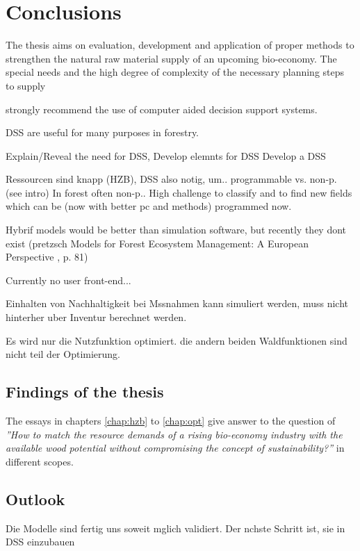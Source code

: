 \chapter{Conclusions}
\label{chap:discussion}
\newpage
\noindent
The thesis aims on evaluation, development and application of proper methods to strengthen the natural raw material supply of an upcoming bio-economy. The special needs and the high degree of complexity 
of the necessary planning steps to supply

strongly recommend the use of computer aided decision support systems.


DSS are useful for many purposes in forestry.

Explain/Reveal the need for DSS, 
Develop elemnts for DSS
Develop a DSS

Ressourcen sind knapp (HZB), DSS also notig, um..
programmable vs. non-p. (see intro) In forest often non-p.. High challenge to classify and to find new fields which can be (now with better pc and methods) programmed now.



Hybrif models would be better than simulation software, but recently they dont exist (pretzsch Models for Forest Ecosystem Management: A European Perspective
, p. 81)

Currently no user front-end...

Einhalten von Nachhaltigkeit bei Mssnahmen kann simuliert werden, muss nicht hinterher uber Inventur berechnet werden.

Es wird nur die Nutzfunktion optimiert. die andern beiden Waldfunktionen sind nicht teil der Optimierung.
\section{Findings of the thesis}
\label{sec:discussion:findings}
The essays in chapters \ref{chap:hzb} to \ref{chap:opt} give answer to the question of \textit{''How to match the resource demands of a rising bio-economy industry with the available wood potential without compromising the concept of sustainability?''} in different scopes.
\section{Outlook}
\label{sec:discussion:outlook}
Die Modelle sind fertig uns soweit mglich validiert. Der nchste Schritt ist, sie in DSS einzubauen